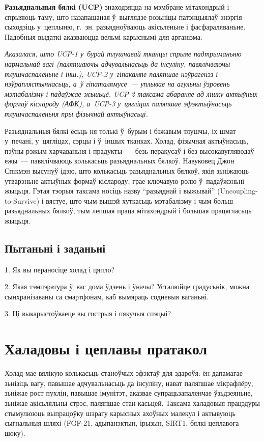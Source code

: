 \textbf{Разьяднальныя бялкі (UCP)} знаходзяцца на мэмбране мітахондрый і спрыяюць таму, што назапашаная ў~выглядзе розьніцы патэнцыялаў энэргія сыходзіць у~цеплыню, г.~зн. разьядноўваюць акісьленьне і фасфараляваньне. Падобныя выдаткі аказваюцца вельмі карыснымі для арганізма.

\emph{Аказалася, што UCP-1 у~бурай тлушчавай тканцы спрыяе падтрыманьню нармальнай вагі (паляпшаючы адчувальнасьць да інсуліну, павялічваючы тлушчаспаленьне і інш.), UCP-2 у~гіпакампе паляпшае нэўрагенэз і нэўраплястычнасьць, а~ў гіпаталямусе~--- уплывае на агульны ўзровень мэтабалізму і падаўжае жыцьцё. UCP-2 таксама абараняе ад лішку актыўных формаў кіслароду (АФК), а~UCP-3 у~цягліцах паляпшае эфэктыўнасьць тлушчаспаленьня пры фізычнай актыўнасьці.}

Разьяднальныя бялкі ёсьць ня толькі ў~бурым і бэжавым тлушчы, іх шмат у~печані, у~цягліцах, сэрцы і ў~іншых тканках. Холад, фізычная актыўнасьць, пэўны рэжым харчаваньня і прадукты~--- безь перакусаў і без высокавугляводаў ежы~--- павялічваюць колькасьць разьяднальных бялкоў. Навуковец Джон Спікмэн высунуў ідэю, што колькасьць разьяднальных бялкоў, якія зьніжаюць утварэньне актыўных формаў кіслароду, грае ключавую ролю ў~падаўжэньні жыцьця. Гэтая тэорыя таксама носіць назву ``разьяднай і выжывай'' (Uncoupling-to-Survive) і вястуе, што чым вышэй хуткасьць мэтабалізму і чым больш разьяднальных бялкоў, тым лепшая праца мітахондрый і большая працягласьць жыцьця.

\subsection*{Пытаньні і заданьні}

1. Як вы пераносіце холад і цяпло?

2. Якая тэмпэратура ў~вас дома ўдзень і ўначы? Усталюйце градусьнік, можна сынхранізаваны са смартфонам, каб вымяраць содневыя ваганьні.

3. Ці выкарыстоўваеце вы гострыя і пякучыя спэцыі?


\section{Халадовы і цеплавы пратакол}

Холад мае вялікую колькасьць станоўчых эфэктаў для здароўя: ён дапамагае зьнізіць вагу, павышае адчувальнасьць да інсуліну, нават паляпшае мікрафлёру, зьніжае рост пухлін, павышае імунітэт, аказвае супрацьзапаленчае ўзьдзеяньне, зьніжае акісьляльны стрэс, паляпшае стан касьцей. Таксама халадовыя працэдуры стымулююць выпрацоўку шэрагу карысных ахоўных малекул і актывуюць сыгнальныя шляхі (FGF-21, адыпанэктын, ірызын, SIRT1, бялкі цеплавога шоку).

